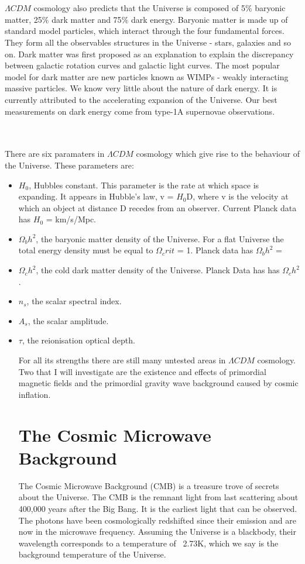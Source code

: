 \documentclass[12pt]{report}
\begin{document}
\begin{itemize}
\\\\$\Lambda CDM$ cosmology also predicts that the Universe is composed of 5$\%$ baryonic matter, 25$\%$ dark matter and 75$\%$ dark energy. Baryonic matter is made up of standard model particles, which interact through the four fundamental forces. They form all the observables structures in the Universe - stars, galaxies and so on. Dark matter was first proposed as an explanation to explain the discrepancy between galactic rotation curves and galactic light curves. The most popular model for dark matter are new particles known as WIMPs - weakly interacting massive particles. We know very little about the nature of dark energy. It is currently attributed to the accelerating expansion of the Universe. Our best measurements on dark energy come from type-1A supernovae observations.

\\\\There are six paramaters in $\Lambda CDM$ cosmology which give rise to the behaviour of the Universe. These parameters are:

\begin{itemize}
\item $H_0$, Hubbles constant. This parameter is the rate at which space is expanding. It appears in Hubble's law, v = $H_0$D, where v is the velocity at which an object at distance D recedes from an observer. Current Planck data has $H_0$ = km/s/Mpc.
\item $\Omega_b h^2$, the baryonic matter density of the Universe. For a flat Universe the total energy density must be equal to $\Omega_crit$ = 1. Planck data has $\Omega_b h^2$ = 
\item $\Omega_c h^2$, the cold dark matter density of the Universe. Planck Data has has $\Omega_c h^2$. 
\item $n_s$, the scalar spectral index.
\item $A_s$, the scalar amplitude.
\item $\tau$, the reionisation optical depth.

For all its strengths there are still many untested areas in $\Lambda CDM$ cosmology. Two that I will investigate are the existence and effects of primordial magnetic fields and the primordial gravity wave background caused by cosmic inflation.

\section{The Cosmic Microwave Background}
The Cosmic Microwave Background (CMB) is a treasure trove of secrets about the Universe. The CMB is the remnant light from last scattering about 400,000 years after the Big Bang. It is the earliest light that can be observed. The photons have been cosmologically redshifted since their emission and are now in the microwave frequency. Assuming the Universe is a blackbody, their wavelength corresponds to a temperature of ~2.73K, which we say is the background temperature of the Universe.


\end{itemize}
\end{itemize}
\end{document}
